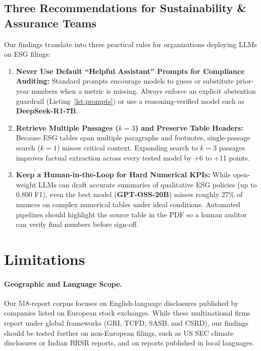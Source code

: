 \documentclass[11pt,letterpaper]{article}
\newcommand{\model}[1]{\textbf{#1}}
\begin{document}
\subsection{Three Recommendations for Sustainability \& Assurance Teams}
Our findings translate into three practical rules for organizations deploying LLMs on ESG filings:
\begin{enumerate}[leftmargin=1.5em, itemsep=2pt]
  \item \textbf{Never Use Default ``Helpful Assistant'' Prompts for Compliance Auditing:} Standard prompts encourage models to guess or substitute prior-year numbers when a metric is missing. Always enforce an explicit abstention guardrail (Listing~\ref{lst:prompts}) or use a reasoning-verified model such as \model{DeepSeek-R1-7B}.
  \item \textbf{Retrieve Multiple Passages ($k=3$) and Preserve Table Headers:} Because ESG tables span multiple paragraphs and footnotes, single-passage search ($k=1$) misses critical context. Expanding search to $k=3$ passages improves factual extraction across every tested model by +6 to +11 points.
  \item \textbf{Keep a Human-in-the-Loop for Hard Numerical KPIs:} While open-weight LLMs can draft accurate summaries of qualitative ESG policies (up to 0.800 F1), even the best model (\model{GPT-OSS-20B}) misses roughly 27\% of nuances on complex numerical tables under ideal conditions. Automated pipelines should highlight the source table in the PDF so a human auditor can verify final numbers before sign-off.
\end{enumerate}

\section{Limitations}
\label{sec:limitations}

\paragraph{Geographic and Language Scope.}
Our 518-report corpus focuses on English-language disclosures published by companies listed on European stock exchanges. While these multinational firms report under global frameworks (GRI, TCFD, SASB, and CSRD), our findings should be tested further on non-European filings, such as US SEC climate disclosures or Indian BRSR reports, and on reports published in local languages.
\end{document}
